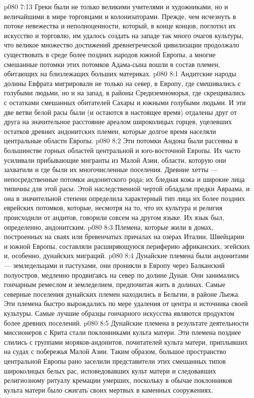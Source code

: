 \vs p080 7:13 \pc Греки были не только великими учителями и художниками, но и величайшими в мире торговцами и колонизаторами. Прежде, чем исчезнуть в потоке невежества и неполноценности, который, в конце концов, поглотил их искусство и торговлю, им удалось создать на западе так много очагов культуры, что великое множество достижений древнегреческой цивилизации продолжало существовать в среде более поздних народов южной Европы, а многие смешанные потомки этих потомков Адама\hyp{}сына вошли в состав племен, обитающих на близлежащих больших материках.
\vs p080 8:1 Андитские народы долины Евфрата мигрировали не только на север, в Европу, где смешивались с голубыми людьми, но и на запад, в районы Средиземноморья, где скрещивались с остатками смешанных обитателей Сахары и южными голубыми людьми. И эти две ветви белой расы были (и остаются в настоящее время) отдалены друг от друга на значительное расстояние ареалом широколицых горцев, уцелевших остатков древних андонитских племен, которые долгое время населяли центральные области Европы.
\vs p080 8:2 Эти потомки Андона были рассеяны в большинстве горных областей центральной и юго\hyp{}восточной Европы. Их часто усиливали прибывающие мигранты из Малой Азии, области, которую они захватили и где были их многочисленные поселения. Древние хетты --- непосредственные потомки андонитского рода; их бледная кожа и широкие лица типичны для этой расы. Этой наследственной чертой обладали предки Авраама, и она в значительной степени определила характерный тип лица их более поздних еврейских потомков, которые, несмотря на то, что их культура и религия происходили от андитов, говорили совсем на другом языке. Их язык был, определенно, андонитским.
\vs p080 8:3 Племена, которые жили в домах, построенных на сваях или бревенчатых причалах на озерах Италии, Швейцарии и южной Европы, составляли расширяющуюся периферию африканских, эгейских и, особенно, дунайских миграций.
\vs p080 8:4 Дунайские племена были андонитами --- земледельцами и пастухами, они проникли в Европу через Балканский полуостров, медленно продвигаясь на север по долине Дуная. Они занимались гончарным ремеслом и земледелием, предпочитая жить в долинах. Самые северные поселения дунайских племен находились в Бельгии, в районе Льежа. Эти племена быстро вырождались по мере удаления от центра и источника своей культуры. Самые лучшие образцы гончарного искусства являются продуктом более древних поселений.
\vs p080 8:5 Дунайские племена в результате деятельности миссионеров с Крита стали поклонниками культа матери. Эти племена позднее слились с группами моряков\hyp{}андонитов, почитателей культа матери, приплывших на судах с побережья Малой Азии. Таким образом, большое пространство центральной Европы рано заселили представители этих смешанных типов широколицых белых рас, исповедовавших культ матери и следовавших религиозному ритуалу кремации умерших, поскольку в обычае поклонников культа матери было сжигать своих мертвых в каменных сооружениях.
